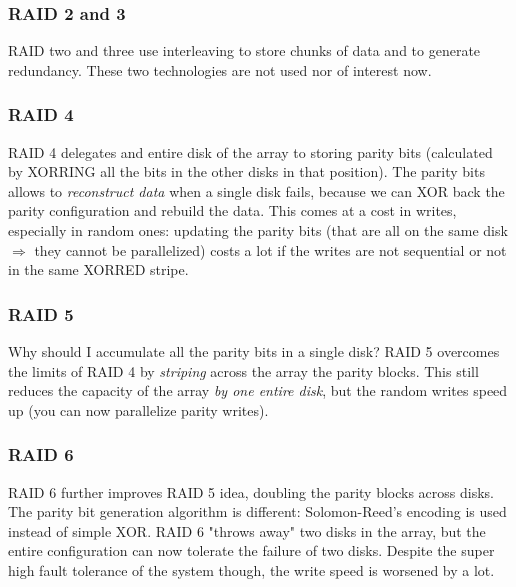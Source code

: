 \documentclass[10pt,a4paper]{article}
\begin{document}
				\subsubsection{RAID 2 and 3}
					RAID two and three use interleaving to store chunks of data and to generate redundancy. These two technologies are not used nor of interest now.
					
				
				\subsubsection{RAID 4}
					RAID 4 delegates and entire disk of the array to storing parity bits (calculated by XORRING all the bits in the other disks in that position). The parity bits allows to \emph{reconstruct data} when a single disk fails, because we can XOR back the parity configuration and rebuild the data. This comes at a cost in writes, especially in random ones: updating the parity bits (that are all on the same disk $\Rightarrow$ they cannot be parallelized) costs a lot if the writes are not sequential or not in the same XORRED stripe. 
				
				\subsubsection{RAID 5}
					Why should I accumulate all the parity bits in a single disk? RAID 5 overcomes the limits of RAID 4 by \emph{striping} across the array the parity blocks. This still reduces the capacity of the array \emph{by one entire disk}, but the random writes speed up (you can now parallelize parity writes).\\
					
				\subsubsection{RAID 6}
					RAID 6 further improves RAID 5 idea, doubling the parity blocks across disks. The parity bit generation algorithm is different: Solomon-Reed's encoding is used instead of simple XOR. RAID 6 "throws away" two disks in the array, but the entire configuration can now tolerate the failure of two disks. Despite the super high fault tolerance of the system though, the write speed is worsened by a lot.
					
\end{document}
